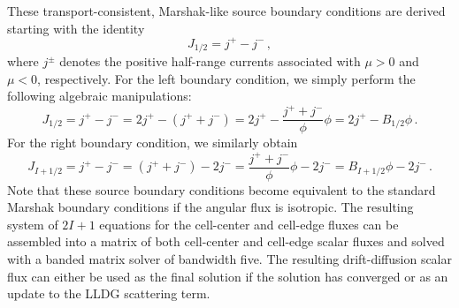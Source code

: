 These transport-consistent, Marshak-like source boundary conditions are derived starting with the identity
\begin{equation}
J_{1/2}=j^+ - j^- \,,
\end{equation}
where $j^\pm$ denotes the positive half-range currents associated with $\mu >0$ and $\mu <0$, respectively.  For the left boundary condition, we simply perform the following algebraic manipulations:
\begin{equation}
J_{1/2} = j^+ - j^-  = 2j^+ - (j^+ + j^-) = 2j^+ - \frac{j^+ + j^-}{\phi} \phi = 2j^+ - B_{1/2} \phi  \, .
\end{equation}
For the right boundary condition, we similarly obtain
\begin{equation}
J_{I+1/2} = j^+ - j^-  = (j^+ + j^-) - 2j^- = \frac{j^+ + j^-}{\phi} \phi - 2j^- = B_{I+1/2} \phi - 2j^-\, .
\end{equation}
Note that these source boundary conditions become equivalent to the standard Marshak boundary conditions if the \SN angular flux 
is isotropic. 
The resulting system of $2I+1$ equations for the cell-center and cell-edge fluxes can be assembled into a matrix of both cell-center and cell-edge scalar fluxes and solved with a banded matrix solver of bandwidth five. The resulting drift-diffusion scalar flux can either be used as the final solution if the solution has converged or as an update to the LLDG \SN scattering term. 

	
	
